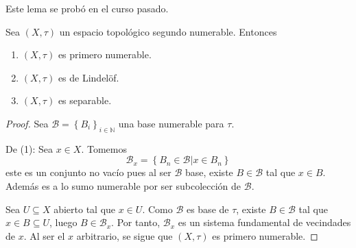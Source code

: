 \documentclass[12pt]{report}
\newcounter{it}
\theoremstyle{largebreak}
\begin{document}
    Este lema se probó en el curso pasado.

    \begin{propo}
        Sea $(X,\tau)$ un espacio topológico segundo numerable. Entonces
        \begin{enumerate}
            \item $(X,\tau)$ es primero numerable.
            \item $(X,\tau)$ es de Lindelöf.
            \item $(X,\tau)$ es separable.
        \end{enumerate}
    \end{propo}

    \begin{proof}
        Sea $\mathcal{B}=\left\{B_i \right\}_{i\in\mathbb{N}}$ una base numerable para $\tau$.
        
        De (1): Sea $x\in X$. Tomemos
        \begin{equation*}
            \mathcal{B}_x=\left\{B_n\in\mathcal{B}\Big|x\in B_n \right\}
        \end{equation*}
        este es un conjunto no vacío pues al ser $\mathcal{B}$ base, existe $B\in\mathcal{B}$ tal que $x\in B$. Además es a lo sumo numerable por ser subcolección de $\mathcal{B}$.

        Sea $U\subseteq X$ abierto tal que $x\in U$. Como $\mathcal{B}$ es base de $\tau$, existe $B\in\mathcal{B}$ tal que $x\in B\subseteq U$, luego $B\in\mathcal{B}_x$. Por tanto, $\mathcal{B}_x$ es un sistema fundamental de vecindades de $x$. Al ser el $x$ arbitrario, se sigue que $(X,\tau)$ es primero numerable.


\end{proof}
\end{document}
